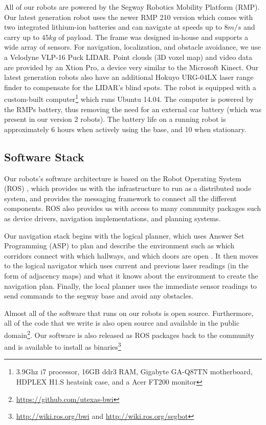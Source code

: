 \documentclass[
  oneside,
  11pt, a4paper,
  footinclude=true,
  headinclude=true,
  cleardoublepage=empty
]{article}
\begin{document}
All of our robots are powered by the Segway Robotics Mobility Platform (RMP).
Our latest generation robot uses the newer RMP 210 version which comes with two
integrated lithium-ion batteries and can navigate at speeds up to $8
m/s$ and carry up to $45 kg$ of payload. The frame was designed in-house
and supports a wide array of sensors. For navigation, localization, and
obstacle avoidance, we use a Velodyne VLP-16 Puck LIDAR. Point clouds (3D voxel
map) and video data are provided by an Xtion Pro, a device very similar to the
Microsoft Kinect. Our latest generation robots also have an additional Hokuyo
URG-04LX laser range finder to compensate for the LIDAR's blind spots. The
robot is equipped with a custom-built computer\footnote{3.9Ghz i7 processor,
16GB ddr3 RAM, Gigabyte GA-Q87TN motherboard, HDPLEX H1.S heatsink case, and a
Acer FT200 monitor} which runs Ubuntu 14.04. The computer is powered by the
RMPs battery, thus removing the need for an external car battery (which was
present in our version 2 robots).  The battery life on a running robot is
approximately 6 hours when actively using the base, and 10 when stationary.

\subsection{Software Stack}

Our robots's software architecture is based on the Robot Operating System (ROS)
\citep{quigley2009}, which provides us with the infrastructure to run as a
distributed node system, and provides the messaging framework to connect all
the different components. ROS also provides us with access to many community
packages such as device drivers, navigation implementations, and planning
systems.

Our navigation stack begins with the logical planner, which uses Answer Set
Programming (ASP) to plan and describe the environment such as which corridors
connect with which hallways, and which doors are open \citep{lifschitz2008}. It
then moves to the logical navigator which uses current and previous laser readings (in
the form of adjacency maps) and what it knows about the environment to create
the navigation plan. Finally, the local planner uses the immediate sensor
readings to send commands to the segway base and avoid any obstacles.

Almost all of the software that runs on our robots is open source. Furthermore,
all of the code that we write is also open source and available in the public
domain\footnote{\url{https://github.com/utexas-bwi}}. Our software is also
released as ROS packages back to the community and is available to install as
binaries\footnote{\url{http://wiki.ros.org/bwi} and
\url{http://wiki.ros.org/segbot}}
\end{document}
